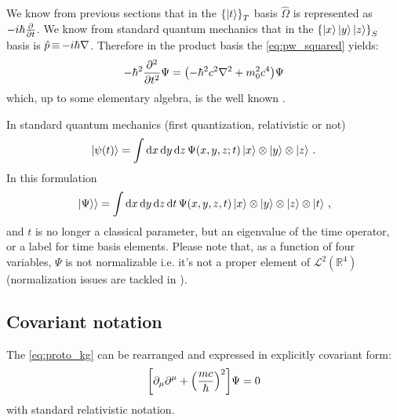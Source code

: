 We know from previous sections that in the $\qty{\ket{t}}_T$ basis $\hat{\Omega}$ is represented as
$-i\hbar\pdv{t}$. We know from standard quantum mechanics that in the $\qty{\ket{x}\ket{y}\ket{z}}_S$
basis is $\hat{p} \operatorname*{\equiv} -i\hbar\nabla$. Therefore in the product basis the \eqref{eq:pw_squared} yields:
\begin{equation}\label{eq:proto_kg}
  -\hbar^2\pdv[2]{t}\Psi = \qty(-\hbar^2 c^2 \nabla^2 + m_0^2 c^4)\Psi
\end{equation}
which, up to some elementary algebra, is the well known .

In standard quantum mechanics (first quantization, relativistic or not)
\begin{equation}
  \ket{\psi(t)} = \int \dd{x}\dd{y}\dd{z} \Psi(x,y,z;t) \ket{x}\otimes\ket{y}\otimes\ket{z} \,\text{.}
\end{equation}
In this formulation
\begin{equation}
  \left.\left| \Psi \right\rangle\right\rangle = \int \dd{x}\dd{y}\dd{z}\dd{t} \Psi(x,y,z,t) \ket{x}\otimes\ket{y}\otimes\ket{z}\otimes\ket{t} \,\text{,}
\end{equation}
and $t$ is no longer a classical parameter, but an eigenvalue of the time operator,
or a label for time basis elements. Please note that, as a function of four variables,
$\Psi$ is not normalizable i.e. it's not a proper element of
$\mathscr{L}^2(\mathbb{R}^4)$
(normalization issues are tackled in \cite[eq. 23 and following]{Lloyd:Time}).

\subsection{Covariant notation}

The \eqref{eq:proto_kg} can be rearranged and expressed in explicitly covariant form:
\begin{equation}
  \qty[\partial_{\mu}\partial^{\mu} + \qty(\frac{mc}{\hbar})^2]\Psi = 0
\end{equation}
with standard relativistic notation.

